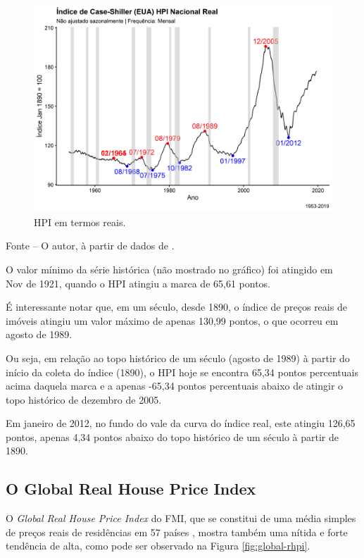 \documentclass[
	12pt,				%
	oneside,			%
	a4paper,			%
	chapter=TITLE,		%
	section=TITLE,		%
	english,			%
	brazil				%
	]{abntex2}
\newcommand{\bcenter}{\begin{center}}
\newcommand{\ecenter}{\end{center}}
\begin{document}
\begin{refsection}
\begin{figure}[H]
{\centering \includegraphics[width=0.7\linewidth]{images/rhpi2-1} 

}

\caption{\gls{HPI} em termos reais.}\label{fig:rhpi2}
\end{figure}
\bcenter

\small Fonte -- O autor, à partir de dados de \textcite{QuandlWIKI}.
\ecenter

O valor mínimo da série histórica (não mostrado no gráfico) foi atingido em\\
Nov de
1921, quando o \gls{HPI} atingiu a marca de
65,61 pontos.

É interessante notar que, em um século, desde 1890, o índice de preços reais de
imóveis atingiu um valor máximo de apenas 130,99
pontos, o que ocorreu em agosto de 1989.

Ou seja, em relação ao topo histórico de um século (agosto de 1989) à partir do
início da coleta do índice (1890), o \gls{HPI} hoje se encontra
65,34 pontos percentuais acima daquela
marca e a apenas -65,34 pontos
percentuais abaixo de atingir o topo histórico de dezembro de 2005.

Em janeiro de 2012, no fundo do vale da curva do índice real, este atingiu
126,65 pontos, apenas
4,34 pontos abaixo do topo
histórico de um século à partir de 1890.

\hypertarget{o-global-real-house-price-index}{%
\subsection{O Global Real House Price Index}\label{o-global-real-house-price-index}}

O \emph{Global Real House Price Index} do \gls{FMI}, que se constitui de uma média
simples de preços reais de residências em 57 países \autocite{fmitwa}, mostra também uma
nítida e forte tendência de alta, como pode ser observado na Figura
\ref{fig:global-rhpi}.
\begin{figure}[H]


\end{figure}
\end{refsection}
\end{document}
